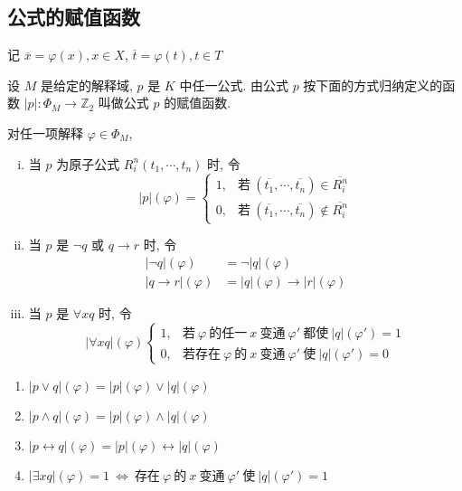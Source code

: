 \documentclass[
    color=black,
    device=normal,
    lang=cn
]{elegantnote}
\begin{document}
\subsection{公式的赋值函数}
记 $\overline{x}=\varphi(x), x\in X$, $\overline{t}=\varphi(t), t\in T$
\begin{definition}[公式的赋值函数]
    设 $M$ 是给定的解释域, $p$ 是 $K$ 中任一公式. 由公式 $p$ 按下面的方式归纳定义的函数 $\lvert p\rvert:\Phi_M\to\mathbb{Z}_2$ 叫做公式 $p$ 的赋值函数.

    对任一项解释 $\varphi\in\Phi_M$,
    \begin{enumerate}[(i)]
        \item 当 $p$ 为原子公式 $R_i^n(t_1, \cdots, t_n)$ 时, 令
              $$
                  \lvert p\rvert (\varphi)=
                  \begin{cases}
                      1, & \text{若}\ (\overline{t_1}, \cdots, \overline{t_n})\in \overline{R_i^n}    \\
                      0, & \text{若}\ (\overline{t_1}, \cdots, \overline{t_n})\notin \overline{R_i^n}
                  \end{cases}
              $$
        \item 当 $p$ 是 $\lnot q$ 或 $q\to r$ 时, 令
              \begin{align*}
                  \lvert\lnot q\rvert(\varphi) & =\lnot\lvert q\rvert(\varphi)                       \\
                  \lvert q\to r\rvert(\varphi) & = \lvert q\rvert(\varphi)\to\lvert r\rvert(\varphi)
              \end{align*}
        \item 当 $p$ 是 $\forall xq$ 时, 令
              $$
                  \lvert\forall x q\rvert(\varphi)
                  \begin{cases}
                      1, & \text{若}\ \varphi\ \text{的任一}\ x\ \text{变通}\ \varphi'\ \text{都使}\ \lvert q\rvert(\varphi')=1 \\
                      0, & \text{若存在}\ \varphi\ \text{的}\ x\ \text{变通}\ \varphi'\ \text{使}\ \lvert q\rvert(\varphi')=0
                  \end{cases}
              $$
    \end{enumerate}
\end{definition}
\begin{proposition}
    \hfill
    \begin{enumerate}[label = $\arabic*^\circ$]
        \item $\lvert p\lor q\rvert (\varphi) = \lvert p\rvert (\varphi)\lor \lvert q\rvert (\varphi)$
        \item $\lvert p\land q\rvert (\varphi) = \lvert p\rvert (\varphi)\land \lvert q\rvert (\varphi)$
        \item $\lvert p\leftrightarrow q\rvert (\varphi) = \lvert p\rvert (\varphi)\leftrightarrow \lvert q\rvert (\varphi)$
        \item $\lvert \exists x q\rvert (\varphi) = 1\ \Leftrightarrow\  \text{存在}\ \varphi\ \text{的}\ x\ \text{变通}\ \varphi'\ \text{使}\ \lvert q\rvert(\varphi')=1$
    \end{enumerate}
\end{proposition}
\end{document}
